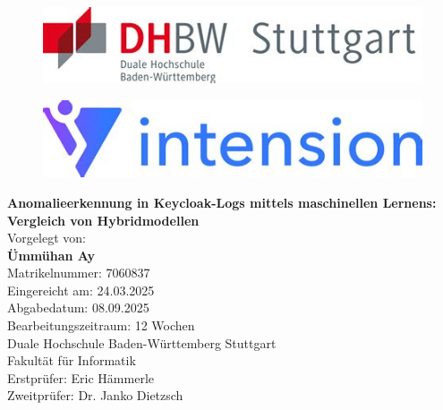 \documentclass[a4paper,12pt]{article}
\begin{document}
	\thispagestyle{empty}
	
	\begin{center}
		\begin{figure}[h]
			\centering
			\begin{minipage}{0.3\linewidth}
				\centering
				\includegraphics[width=\linewidth]{Bilder/screenshot017}
				\label{fig:screenshot017}
			\end{minipage}
			\hspace{4cm}
			\begin{minipage}{0.3\linewidth}
				\centering
				\includegraphics[width=\linewidth]{Bilder/screenshot018}
				\label{fig:screenshot018}
			\end{minipage}
		\end{figure}
		\vspace*{2cm}
		\Huge\textbf{Anomalieerkennung in Keycloak-Logs mittels maschinellen Lernens: Vergleich von Hybridmodellen} \\[1.5cm]
		
		\normalsize
		Vorgelegt von: \\[0.3cm]
		\textbf{Ümmühan Ay} \\
		Matrikelnummer: 7060837 \\[1cm]
		
		Eingereicht am: 24.03.2025 \\[0.3cm]
		Abgabedatum: 08.09.2025 \\[1cm]
		
		Bearbeitungszeitraum: 12 Wochen \\[1cm]
		
		Duale Hochschule Baden-Württemberg Stuttgart\\
		Fakultät für Informatik \\[2cm]
		
		Erstprüfer: Eric Hämmerle \\
		Zweitprüfer: Dr. Janko Dietzsch
		
	\end{center}
	\newpage
\end{document}
